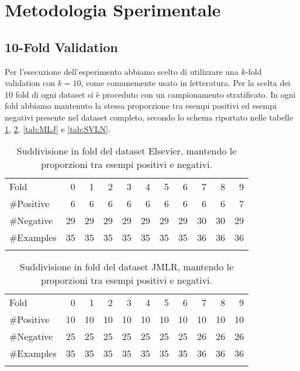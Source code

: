 \section{Metodologia Sperimentale}


\subsection{10-Fold Validation}

Per l'esecuzione dell'esperimento abbiamo scelto di utilizzare una $k$-fold validation con $k=10$, come comunemente usato in letteratura.
Per la scelta dei $10$ fold di ogni dataset si è proceduto con un campionamento stratificato. In ogni fold abbiamo mantenuto la stessa proporzione tra esempi positivi ed esempi negativi presente nel dataset completo, secondo lo schema riportato nelle tabelle  \ref{tab:Elsevier}, \ref{tab:JMLR}, \ref{tab:MLJ} e \ref{tab:SVLN}.

\begin{table}[H]
	\centering
		\begin{tabular}{l@{\qquad}*{10}{r}}
		\toprule
\addlinespace
			Fold &  0 &  1 &  2 &  3 &  4 &  5 &  6 &  7 &  8 &  9 \\
\addlinespace
\midrule
\addlinespace
\#Positive  & 6  & 6  &  6 &  6 &  6 &  6 &  6 &  6 &  6 &  7 \\
\#Negative  & 29 & 29 & 29 & 29 & 29 & 29 & 29 & 30 & 30 & 29 \\
\#Examples & 35 & 35 & 35 & 35 & 35 & 35 & 35 & 36 & 36 & 36 \\
\addlinespace
\bottomrule
		\end{tabular}
		\caption[Elsevier: suddivisione in fold.]{Suddivisione in fold del dataset Elsevier, mantendo le proporzioni tra esempi positivi e negativi.}
	\label{tab:Elsevier}
\end{table}

\begin{table}[H]
\centering
\begin{tabular}{l@{\qquad}*{10}{r}}
		\toprule
\addlinespace
Fold &  0 &  1 &  2 &  3 &  4 &  5 &  6 &  7 &  8 &  9 \\
\addlinespace
\midrule
\addlinespace
\#Positive  & 10  & 10  &  10 &  10 &  10 &  10 &  10 &  10 &  10 &  10 \\
\#Negative  & 25 & 25 & 25 & 25 & 25 & 25 & 25 & 26 & 26 & 26 \\
\#Examples  & 35 & 35 & 35 & 35 & 35 & 35 & 35 & 36 & 36 & 36 \\
\addlinespace
\bottomrule
\end{tabular}
		\caption[JMLR: suddivisione in fold.]{Suddivisione in fold del dataset JMLR, mantendo le proporzioni tra esempi positivi e negativi.}
	\label{tab:JMLR}
\end{table}


